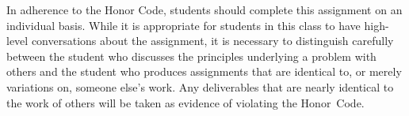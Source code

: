 In adherence to the Honor Code, students should complete this assignment on an individual basis. While it is appropriate
for students in this class to have high-level conversations about the assignment, it is necessary to distinguish
carefully between the student who discusses the principles underlying a problem with others and the student who produces
assignments that are identical to, or merely variations on, someone else's work. Any deliverables that are nearly
identical to the work of others will be taken as evidence of violating the \mbox{Honor Code}.



